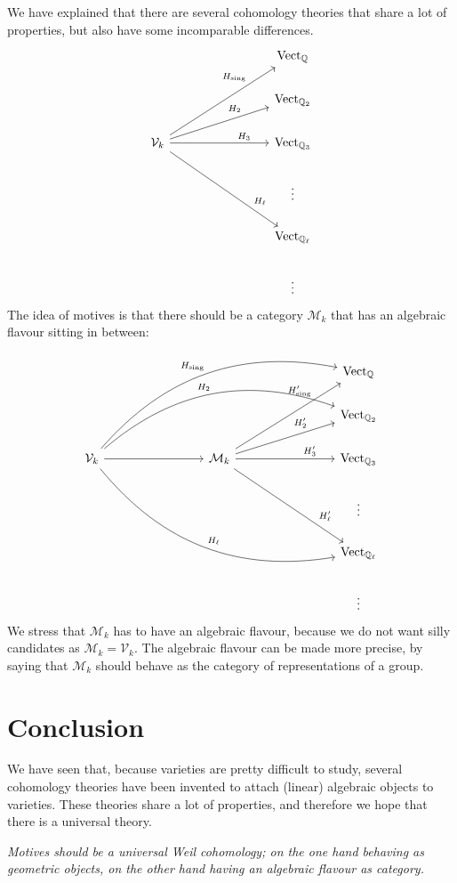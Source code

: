 \documentclass[a4paper,10pt]{article}
\begin{document}
We have explained that there are several cohomology theories that share a lot
of properties, but also have some incomparable differences.
\[
	\begin{tikzcd}[column sep=8em] %
		\null & \mathrm{Vect}_{\mathbb{Q}} \\
		& \mathrm{Vect}_{\mathbb{Q}_{2}} \\
		\mathcal{V}_{k}
		\ar{uur}[near end]{H_{\mathrm{sing}}}
		\ar{ur}[near end]{H_{2}}
		\ar{r}[near end]{H_{3}}
		\ar{ddr}[near end]{H_{\ell}}
		& \mathrm{Vect}_{\mathbb{Q}_{3}} \\
		& \vdots \\
		& \mathrm{Vect}_{\mathbb{Q}_{\ell}} \\
		& \vdots
	\end{tikzcd} %
\]
The idea of motives is that there should be a category $\mathcal{M}_{k}$ that
has an algebraic flavour sitting in between:
\[
	\begin{tikzcd}[column sep=8em] %
		\null && \mathrm{Vect}_{\mathbb{Q}} \\
		&& \mathrm{Vect}_{\mathbb{Q}_{2}} \\
		\mathcal{V}_{k} \rar{}
		\ar[bend left]{uurr}{H_{\mathrm{sing}}}
		\ar[bend left]{urr}{H_{2}}
		\ar[bend right]{ddrr}{H_{\ell}}
		& \mathcal{M}_{k}
		\ar{uur}[near end]{H'_{\mathrm{sing}}}
		\ar{ur}[near end]{H'_{2}}
		\ar{r}[near end]{H'_{3}}
		\ar{ddr}[near end]{H'_{\ell}}
		& \mathrm{Vect}_{\mathbb{Q}_{3}} \\
		&& \vdots \\
		&& \mathrm{Vect}_{\mathbb{Q}_{\ell}} \\
		&& \vdots
	\end{tikzcd} %
\]
We stress that $\mathcal{M}_{k}$ has to have an algebraic flavour, because we
do not want silly candidates as $\mathcal{M}_{k} = \mathcal{V}_{k}$. The
algebraic flavour can be made more precise, by saying that $\mathcal{M}_{k}$
should behave as the category of representations of a group.

\section{Conclusion}

We have seen that, because varieties are pretty difficult to study, several
cohomology theories have been invented to attach (linear) algebraic objects to
varieties. These theories share a lot of properties, and therefore we hope that
there is a universal theory.

\begin{center} %
	\begin{minipage}{.75\textwidth} %
		\emph{Motives should be a universal Weil cohomology; on the one
			hand behaving as geometric objects, on the other hand
		having an algebraic flavour as category.}
	\end{minipage} %
\end{center} %
\end{document}
